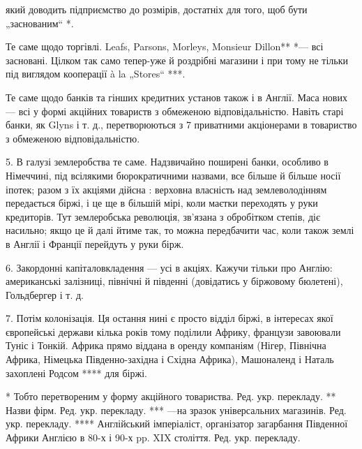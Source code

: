 \parcont{}  %
який доводить підприємство до розмірів, достатніх для того, щоб бути „заснованим“ *.

Те саме щодо торгівлі. Leafs, Parsons, Morleys, Monsieur Dillon** *— всі засновані. Цілком так само тепер-уже й роздрібні
магазини і при тому не тільки під виглядом кооперації à la  „Stores“ ***.

Те саме щодо банків та гінших кредитних установ також і в Англії. Маса нових — всі у формі акційних товариств з обмеженою
відповідальністю. Навіть старі банки, як Glyns і т. д., перетворюються з 7 приватними акціонерами в товариство з обмеженою відповідальністю.

5. В галузі землеробства те саме. Надзвичайно поширені банки, особливо в Німеччині, під всілякими
бюрократичними назвами, все більше й більше носії іпотек; разом з їх акціями дійсна :  верховна власність над
землеволодінням передається біржі, і це
ще в більшій мірі, коли маєтки переходять у руки кредиторів. Тут землеробська революція, зв’язана з обробітком степів, діє
насильно; якщо це й далі йтиме так, то можна передбачити час, коли також землі в Англії і Франції перейдуть у руки бірж.

6. Закордонні капіталовкладення — усі в акціях. Кажучи тільки про Англію: американські залізниці, північні й південні
(довідатись у біржовому бюлетені), Гольдбергер і т. д.

7. Потім колонізація. Ця остання нині є просто відділ біржі, в інтересах
якої європейські держави кілька років тому поділили Африку, французи завоювали Туніс і Тонкій. Африка прямо віддана в
оренду компаніям (Нігер, Північна Африка, Німецька Південно-західна і Східна Африка), Машоналенд і Наталь захоплені Родсом
**** для біржі.

* Тобто перетвореним у форму акційного товариства. Ред. укр. перекладу.
** Назви фірм. Ред. укр. перекладу.
*** —на зразок універсальних магазинів. Ред. укр. перекладу.
**** Англійський імперіаліст, організатор загарбання Південної Африки Англією в 80-х і 90-х pp. XIX століття. Ред. укр.
перекладу.
